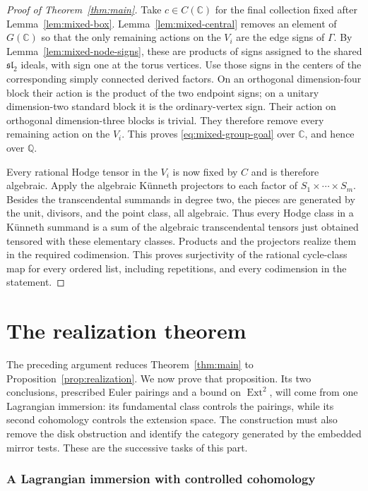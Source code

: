\documentclass[11pt]{article}
\numberwithin{equation}{section}
\theoremstyle{definition}
\theoremstyle{remark}
\begin{document}
\begin{proof}[Proof of Theorem~\ref{thm:main}]
Take $c\in C(\mathbb C)$ for the final collection fixed after
Lemma~\ref{lem:mixed-box}.  Lemma~\ref{lem:mixed-central} removes
an element of $G(\mathbb C)$ so that the only remaining actions on the
$V_i$ are the edge signs of $\Gamma$.  By
Lemma~\ref{lem:mixed-node-signs}, these are products of signs
assigned to the shared $\mathfrak{sl}_2$ ideals, with sign one at
the torus vertices.  Use those signs in the centers of the
corresponding simply connected derived factors.  On an orthogonal
dimension-four block their action is the product of the two
endpoint signs; on a unitary dimension-two standard block it is
the ordinary-vertex sign.  Their action on orthogonal
dimension-three blocks is trivial.  They therefore remove every
remaining action on the $V_i$.  This proves
\eqref{eq:mixed-group-goal} over $\mathbb C$, and hence over $\mathbb Q$.

Every rational Hodge tensor in the $V_i$ is now fixed by $C$ and
is therefore algebraic.  Apply the algebraic K\"unneth projectors
to each factor of $S_1\times\cdots\times S_m$.  Besides the
transcendental summands in degree two, the pieces are generated by
the unit, divisors, and the point class, all algebraic.  Thus every
Hodge class in a K\"unneth summand is a sum of the algebraic
transcendental tensors just obtained tensored with these elementary
classes.  Products and the projectors realize them in the required
codimension.  This proves surjectivity of the rational cycle-class
map for every ordered list, including repetitions, and every
codimension in the statement.
\end{proof}


\part{The realization theorem}
\label{part:realization}

The preceding argument reduces Theorem~\ref{thm:main} to
Proposition~\ref{prop:realization}.  We now prove that proposition.
Its two conclusions, prescribed Euler pairings and a bound on
\(\operatorname{Ext}^2\), will come from one Lagrangian immersion: its fundamental
class controls the pairings, while its second cohomology controls the
extension space.  The construction must also remove the disk
obstruction and identify the category generated by the embedded mirror
tests.  These are the successive tasks of this part.

\section{A Lagrangian immersion with controlled cohomology}
\label{sec:topology}
\end{document}

